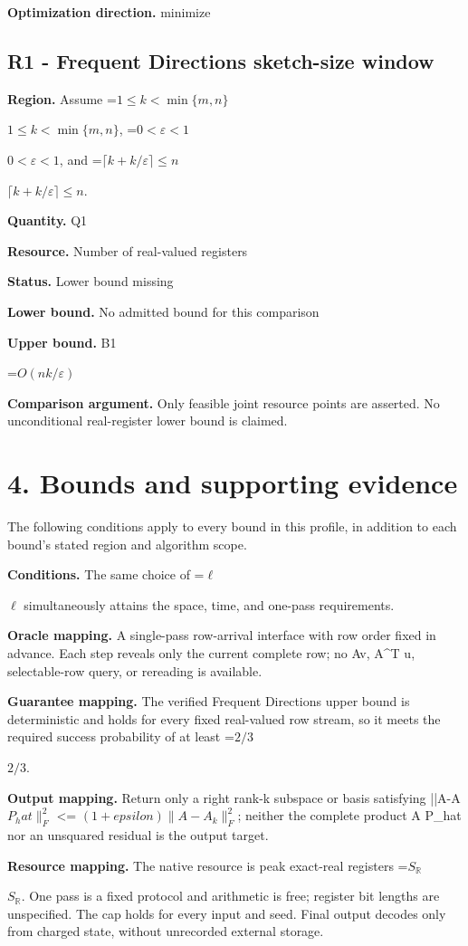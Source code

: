 \documentclass[10pt,a4paper]{article}
\newcommand{\AtlasMath}[1]{\par\begingroup\centering\setbox0=\hbox{$\displaystyle #1$}\ifdim\wd0>1.4\linewidth\typeout{ATLAS WIDE FORMULA: \the\wd0}\fi\ifdim\wd0>\linewidth\resizebox{\linewidth}{!}{\box0}\else\box0\fi\par\endgroup}
\newcommand{\AtlasInlineMath}[1]{\begingroup\setbox0=\hbox{$#1$}\ifdim\wd0>.4\linewidth\endgroup\AtlasMath{#1}\else\endgroup$#1$\fi}
\begin{document}
\textbf{Optimization direction.} minimize

\subsection{R1 - Frequent Directions sketch-size window}
\textbf{Region.} Assume \AtlasInlineMath{1\le k<\min\{m,n\}}, \AtlasInlineMath{0<\varepsilon<1}, and \AtlasInlineMath{\lceil k+k/\varepsilon\rceil\le n}.

\textbf{Quantity.} Q1

\textbf{Resource.} Number of real-valued registers

\textbf{Status.} Lower bound missing

\textbf{Lower bound.} No admitted bound for this comparison

\textbf{Upper bound.} B1

\AtlasMath{O(nk/\varepsilon)}
\textbf{Comparison argument.} Only feasible joint resource points are asserted. No unconditional real-register lower bound is claimed.

\section{4. Bounds and supporting evidence}
The following conditions apply to every bound in this profile, in addition to each bound's stated region and algorithm scope.

\textbf{Conditions.} The same choice of \AtlasInlineMath{\ell} simultaneously attains the space, time, and one-pass requirements.

\textbf{Oracle mapping.} A single-pass row-arrival interface with row order fixed in advance. Each step reveals only the current complete row; no Av, A\textasciicircum{}T u, selectable-row query, or rereading is available.

\textbf{Guarantee mapping.} The verified Frequent Directions upper bound is deterministic and holds for every fixed real-valued row stream, so it meets the required success probability of at least \AtlasInlineMath{2/3}.

\textbf{Output mapping.} Return only a right rank-k subspace or basis satisfying ||A-A $P_hat\|_F^2$ <= $(1+epsilon)\|A-A_k\|_F^2$; neither the complete product A P\_hat nor an unsquared residual is the output target.

\textbf{Resource mapping.} The native resource is peak exact-real registers \AtlasInlineMath{S_{\mathbb R}}. One pass is a fixed protocol and arithmetic is free; register bit lengths are unspecified. The cap holds for every input and seed. Final output decodes only from charged state, without unrecorded external storage.
\end{document}
